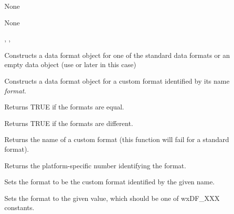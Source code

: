 
None


None


, 
, 


\label{wxdataformatwxdataformatdef}


Constructs a data format object for one of the standard data formats or an
empty data object (use  or 
 later in this case)

\label{wxdataformatwxdataformat}


Constructs a data format object for a custom format identified by its name 
{\it format}.

\label{wxdataformatoperatoreq}


Returns TRUE if the formats are equal.

\label{wxdataformatoperatorneq}


Returns TRUE if the formats are different.

\label{wxdataformatgetid}


Returns the name of a custom format (this function will fail for a standard
format).

\label{wxdataformatgettype}


Returns the platform-specific number identifying the format.

\label{wxdataformatsetid}


Sets the format to be the custom format identified by the given name.

\label{wxdataformatsettype}


Sets the format to the given value, which should be one of wxDF\_XXX constants.


